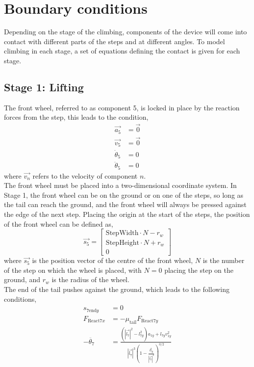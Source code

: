 \section{Boundary conditions}
Depending on the stage of the climbing, components of the device will come into contact with different parts of the steps and at different angles. To model climbing in each stage, a set of equations defining the contact is given for each stage.\\
\subsection*{Stage 1: Lifting}
The front wheel, referred to as component 5, is locked in place by the reaction forces from the step, this leads to the condition,
\begin{subequations}
	\label{wheel1locked}
	\begin{align}
		\vec{a_5} &= \vec{0}\\
		\vec{v_5} &= \vec{0}\\
		\dot{\theta}_5 &= 0\\
		\ddot{\theta}_5 &= 0
	\end{align}
\end{subequations}
where $\vec{v_n}$ refers to the velocity of component $n$. \\
The front wheel must be placed into a two-dimensional coordinate system. In Stage 1, the front wheel can be on the ground or on one of the steps, so long as the tail can reach the ground, and the front wheel will always be pressed against the edge of the next step. Placing the origin at the start of the steps, the position of the front wheel can be defined as,
\begin{equation}
	\vec{s_5}
	=
	\begin{bmatrix}
		\mathrm{StepWidth}\cdot N-r_w\\
		\mathrm{StepHeight}\cdot N+r_w\\
		0
	\end{bmatrix}
\end{equation}
where $\vec{s_5}$ is the position vector of the centre of the front wheel, $N$ is the number of the step on which the wheel is placed, with $N = 0$ placing the step on the ground, and $r_w$ is the radius of the wheel.\\
The end of the tail pushes against the ground, which leads to the following conditions,
\begin{subequations}
	\label{tailonground}
	\begin{align}
		s_{7\mathrm{end}y} &= 0\\
		F_{\mathrm{React}7x} &=  -\mu_{\mathrm{tail}}F_{\mathrm{React}7y}\\
		-\ddot{\theta_7} &= \frac{(|\vec{l_7}|^2 - l_{7y}^2)a_{1y} + l_{7y}v_{1y}^2}{|\vec{l_7}|^3 (1 - \frac{l_{7y}^2}{|\vec{l_7}|^2})^{3/2}} \label{tailongroundkinematics}
	\end{align}
\end{subequations}
